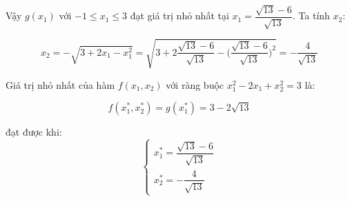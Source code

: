 \documentclass[14pt, a4paper]{article}
\theoremstyle{sltheorem}
\theoremstyle{soltheorem}
\begin{document}
    Vậy $g(x_1)$ với $-1 \leq x_1 \leq 3$ đạt giá trị nhỏ nhất tại $x_1 = \dfrac{\sqrt{13} - 6}{\sqrt{13}}$.
    Ta tính $x_2$:

    \begin{equation*}
        x_2 = - \sqrt{3 + 2x_1 - x_1^2}= \sqrt{3 + 2 \dfrac{\sqrt{13} - 6}{\sqrt{13}} - \Big( \dfrac{\sqrt{13} - 6}{\sqrt{13}} \Big)^2} = -\dfrac{4}{\sqrt{13}}
    \end{equation*}

    Giá trị nhỏ nhất của hàm $f(x_1, x_2)$ với ràng buộc $x_1^2 - 2x_1 + x_2^2 = 3$ là:

    \begin{equation*}
        f(x_1^*, x_2^*) = g(x_1^{*}) = 3 - 2\sqrt{13}
    \end{equation*}

    đạt được khi:
    \begin{equation*}
        \begin{cases} 
            x_1^* = \dfrac{\sqrt{13} - 6}{\sqrt{13}} \\ 
            x_2^* = - \dfrac{4}{\sqrt{13}} 
        \end{cases}
    \end{equation*}

    \newpage
    \printbibliography[title={TÀI LIỆU THAM KHẢO}]
\end{document}
